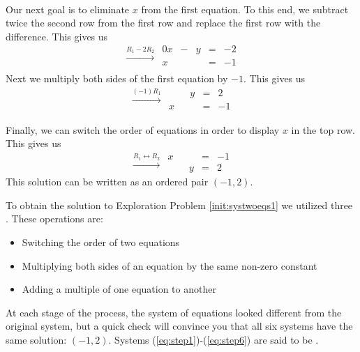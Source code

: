 \documentclass{ximera}
\begin{document}
\begin{initprob}
\begin{equation}
\begin{array}{ccccc}
    \end{array}
    \end{equation}
Our next goal is to eliminate $x$ from the first equation.  To this end, we subtract twice the second row from the first row and replace the first row with the difference. This gives us
\begin{equation}\label{eq:step4}
\begin{array}{c}
 \xrightarrow{R_1-2R_2}\\
 \\
 \end{array}
 \begin{array}{ccccc}
	 0x& -&y&=&-2\\
     x & &&= &-1 \\
    \end{array}
\end{equation}
Next we multiply both sides of the first equation by $-1$. This gives us
\begin{equation}\label{eq:step5}
\begin{array}{c}
 \xrightarrow{(-1)R_1}\\
 \\
 \end{array}
 \begin{array}{ccccc}
      & &y&=&2\\
      x & &&= &-1
    \end{array}
\end{equation}    
    
Finally, we can switch the order of equations in order to display $x$ in the top row.  This gives us
\begin{equation}\label{eq:step6}
\begin{array}{c}
 \xrightarrow{R_1\leftrightarrow R_2}\\
 
 \end{array}
\begin{array}{ccccc}
      x & &&= &-1\\
      & &y&=&2      
    \end{array}
\end{equation}    
This solution can be written as an ordered pair $(-1, 2)$.  
\end{initprob}

To obtain the solution to Exploration Problem \ref{init:systwoeqs1} we utilized three .  These operations are:
\begin{itemize}
\item Switching the order of two equations
\item Multiplying both sides of an equation by the same non-zero constant
\item Adding a multiple of one equation to another
\end{itemize}
At each stage of the process, the system of equations looked different from the original system, but a quick check will convince you that all six systems have the same solution: $(-1, 2)$.  Systems (\ref{eq:step1})-(\ref{eq:step6}) are said to be .  
\end{document}
